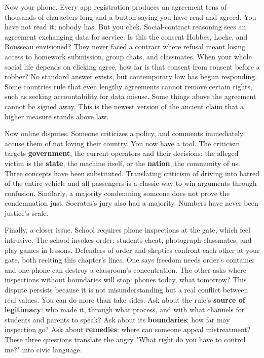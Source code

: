 Now your phone. Every app registration produces an agreement tens of thousands of characters long and a button saying you have read and agreed. You have not read it; nobody has. But you click. Social-contract reasoning sees an agreement exchanging data for service. Is this the consent Hobbes, Locke, and Rousseau envisioned? They never faced a contract where refusal meant losing access to homework submission, group chats, and classmates. When your whole social life depends on clicking agree, how far is that consent from consent before a robber? No standard answer exists, but contemporary law has begun responding. Some countries rule that even lengthy agreements cannot remove certain rights, such as seeking accountability for data misuse. Some things above the agreement cannot be signed away. This is the newest version of the ancient claim that a higher measure stands above law.

Now online disputes. Someone criticizes a policy, and comments immediately accuse them of not loving their country. You now have a tool. The criticism targets \textbf{government}, the current operators and their decisions; the alleged victim is the \textbf{state}, the machine itself, or the \textbf{nation}, the community of us. Three concepts have been substituted. Translating criticism of driving into hatred of the entire vehicle and all passengers is a classic way to win arguments through confusion. Similarly, a majority condemning someone does not prove the condemnation just. Socrates's jury also had a majority. Numbers have never been justice's scale.

Finally, a closer issue. School requires phone inspections at the gate, which feel intrusive. The school invokes order: students cheat, photograph classmates, and play games in lessons. Defenders of order and skeptics confront each other at your gate, both reciting this chapter's lines. One says freedom needs order's container and one phone can destroy a classroom's concentration. The other asks where inspections without boundaries will stop: phones today, what tomorrow? This dispute persists because it is not misunderstanding but a real conflict between real values. You can do more than take sides. Ask about the rule's \textbf{source of legitimacy}: who made it, through what process, and with what channels for students and parents to speak? Ask about its \textbf{boundaries}: how far may inspection go? Ask about \textbf{remedies}: where can someone appeal mistreatment? These three questions translate the angry "What right do you have to control me?" into civic language.

